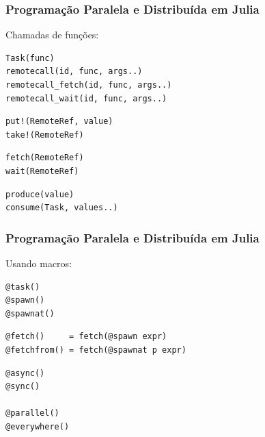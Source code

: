 \documentclass[10pt, compress]{beamer}
\begin{document}
\begin{frame}[fragile]
    \frametitle{Programação Paralela e Distribuída em Julia}
    Chamadas de funções:

    \begin{lstlisting}
Task(func)
remotecall(id, func, args..)
remotecall_fetch(id, func, args..)
remotecall_wait(id, func, args..)
    \end{lstlisting}
    \begin{lstlisting}
put!(RemoteRef, value)
take!(RemoteRef)
    \end{lstlisting}
    \begin{lstlisting}
fetch(RemoteRef)
wait(RemoteRef)
    \end{lstlisting}
    \begin{lstlisting}
produce(value)
consume(Task, values..)
    \end{lstlisting}
    \let\thefootnote\relax{}
    \let\thefootnote\relax{}
\end{frame}

\begin{frame}[fragile]
    \frametitle{Programação Paralela e Distribuída em Julia}
    Usando macros:
    \begin{lstlisting}
@task()
@spawn()
@spawnat()
    \end{lstlisting}
    \begin{lstlisting}
@fetch()     = fetch(@spawn expr)
@fetchfrom() = fetch(@spawnat p expr)
    \end{lstlisting}
    \begin{lstlisting}
@async()
@sync()

@parallel()
@everywhere()
    \end{lstlisting}
    \let\thefootnote\relax{}
    \let\thefootnote\relax{}
\end{frame}
\end{document}
